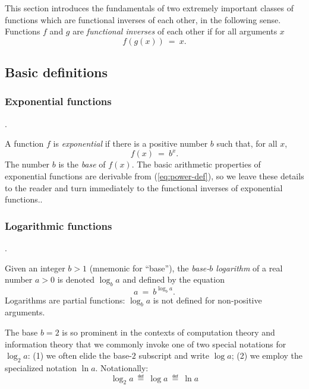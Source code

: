 This section introduces the fundamentals of two extremely important
classes of functions which are functional inverses of each other, in
the following sense.  Functions $f$ and $g$ are {\it functional
  inverses} of each other if for all
arguments $x$
\begin{equation}
\label{eq:functional-inverse}
f(g(x)) \ = \ x.
\end{equation}

\subsection{Basic definitions}

\subsubsection{Exponential functions}.

A function $f$ is {\it exponential} if there is a positive number $b$
such that, for all $x$,
\begin{equation}
\label{eq:exponential-defn}
f(x) \ = \ b^x.
\end{equation}
The number $b$ is the {\it base}
%
of $f(x)$.  The basic arithmetic properties of exponential functions
are derivable from (\ref{eq:power-def}), so we leave these details to
the reader and turn immediately to the functional inverses of
exponential functions..

\subsubsection{Logarithmic functions}.
\label{sec:logarithmic-fns}

Given an integer $b >1$ (mnemonic for ``base''), the {\em base-$b$
  logarithm}
%
of a real number $a > 0$ is denoted $\log_b a$ and defined by the
equation
\begin{equation}
\label{eq:logarithm-defn}
a \ = \ b^{\log_b a}.
\end{equation}
Logarithms are partial functions: $\log_b a$ is not defined for
non-positive arguments.

The base $b = 2$ is so prominent in the contexts of computation theory
and information theory that we commonly invoke one of two special
notations for $\log_2 a$: (1) we often elide the base-$2$ subscript
and write $\log a$;
(2) we employ the specialized notation $\ln a$.  Notationally:
\[ \log_2 a \ \eqdef \ \log a \ \eqdef \ \ln a \]

